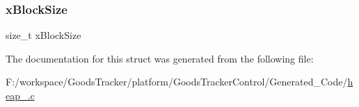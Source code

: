\subsubsection{\texorpdfstring{x\+Block\+Size}{xBlockSize}}
{\footnotesize\ttfamily size\+\_\+t x\+Block\+Size}



The documentation for this struct was generated from the following file\+:\begin{DoxyCompactItemize}
\item 
F\+:/workspace/\+Goods\+Tracker/platform/\+Goods\+Tracker\+Control/\+Generated\+\_\+\+Code/\hyperlink{heap__4_8c}{heap\+\_.\+c}\end{DoxyCompactItemize}
